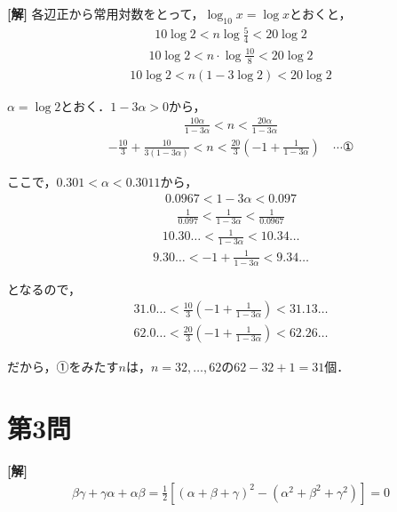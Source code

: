 \documentclass[../main.tex]{subfiles}
\begin{document}
{\bf [解]}
各辺正から常用対数をとって，$\log_{10}x=\log x$とおくと，
\begin{align*}
  10\log2<n\log\frac54<20\log2
\end{align*}
\begin{align*}
  10\log2<n\cdot\log\frac{10}8<20\log2
\end{align*}
\begin{align*}
  10\log2<n(1-3\log2)<20\log2
\end{align*}

$\alpha=\log2$とおく．$1-3\alpha>0$から，
\begin{align*}
  \frac{10\alpha}{1-3\alpha}<n<\frac{20\alpha}{1-3\alpha}
\end{align*}
\begin{align*}
  -\frac{10}3+\frac{10}{3(1-3\alpha)}<n<\frac{20}3\left(-1+\frac1{1-3\alpha}\right)\quad\cdots①
\end{align*}

ここで，$0.301<\alpha<0.3011$から，
\begin{align*}
  0.0967<1-3\alpha<0.097
\end{align*}
\begin{align*}
  \frac1{0.097}<\frac1{1-3\alpha}<\frac1{0.0967}
\end{align*}
\begin{align*}
  10.30\ldots<\frac1{1-3\alpha}<10.34\ldots
\end{align*}
\begin{align*}
  9.30\ldots<-1+\frac1{1-3\alpha}<9.34\ldots
\end{align*}

となるので，
\begin{align*}
  31.0\ldots<\frac{10}3\left(-1+\frac1{1-3\alpha}\right)<31.13\ldots
\end{align*}
\begin{align*}
  62.0\ldots<\frac{20}3\left(-1+\frac1{1-3\alpha}\right)<62.26\ldots
\end{align*}

だから，①をみたす$n$は，$n=32,\ldots,62$の$62-32+1=31$個．

\newpage

\section*{第3問}

{\bf [解]}
\begin{align*}
  \beta\gamma+\gamma\alpha+\alpha\beta=\frac12\left[(\alpha+\beta+\gamma)^2-(\alpha^2+\beta^2+\gamma^2)\right]=0
\end{align*}
\end{document}
